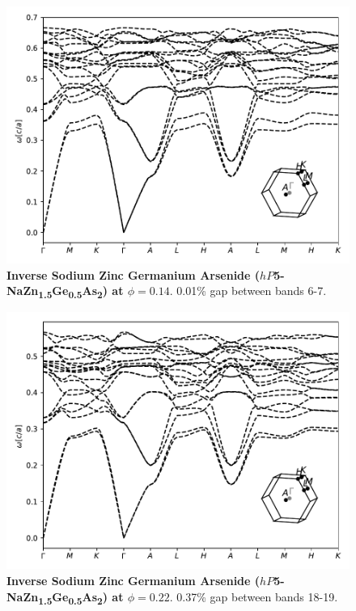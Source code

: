 \documentclass[fleqn,amsmath,amssymb,superscriptaddress, reprint,prl]{revtex4-1}
\begin{document}
\begin{figure}
\includegraphics[width=0.9\linewidth]{workspace/88b05ddb26baab1682a01f5c7f0c83b1/images/r=44.pdf}
	\caption{\textbf{Inverse Sodium Zinc Germanium Arsenide ($hP$5-NaZn\textsubscript{1}\textsubscript{.}\textsubscript{5}Ge\textsubscript{0}\textsubscript{.}\textsubscript{5}As\textsubscript{2}) at $\phi=0.14$}. 0.01\% gap between bands 6-7.}
\end{figure}

\begin{figure}
\includegraphics[width=0.9\linewidth]{workspace/88b05ddb26baab1682a01f5c7f0c83b1/images/r=41.pdf}
	\caption{\textbf{Inverse Sodium Zinc Germanium Arsenide ($hP$5-NaZn\textsubscript{1}\textsubscript{.}\textsubscript{5}Ge\textsubscript{0}\textsubscript{.}\textsubscript{5}As\textsubscript{2}) at $\phi=0.22$}. 0.37\% gap between bands 18-19.}
\end{figure}
\end{document}
